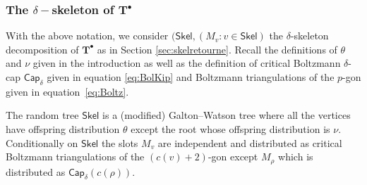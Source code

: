 \documentclass[AHL,XML,longabstracts,Unicode,NoSaveZebib]{cedram}
\begin{document}
\subsubsection{The \texorpdfstring{$\delta-$}{delta-}skeleton of \texorpdfstring{$\mathbf{T}^{\bullet}$}{T*}}
With the above notation, we consider $( \mathsf{Skel}, (M_{v} : v \in \mathsf{Skel} )$ the $\delta$-skeleton decomposition of $ \mathbf{T}^{\bullet}$ as in Section \ref{sec:skelretourne}. Recall the definitions of $\theta$ and $\nu$ given in the introduction as well as the definition of critical Boltzmann $\delta$-cap $\mathsf{Cap}_{\delta}$ given in equation \eqref{eq:BolKip} and Boltzmann triangulations of the $p$-gon given in equation~\eqref{eq:Boltz}.
\begin{proposition}
\label{prop:skelfinite}
The random tree $ \mathsf{Skel}$ is a (modified) Galton--Watson tree where all the vertices have offspring distribution $\theta$ except the root whose offspring distribution is $\nu$. Conditionally on $ \mathsf{Skel}$ the slots $M_{v}$ are independent and distributed as critical Boltzmann triangulations of the $(c(v)+2)$-gon except $M_{\rho}$ which is distributed as $\mathsf{Cap}_{\delta}(c(\rho))$.
\end{proposition}
\end{document}
